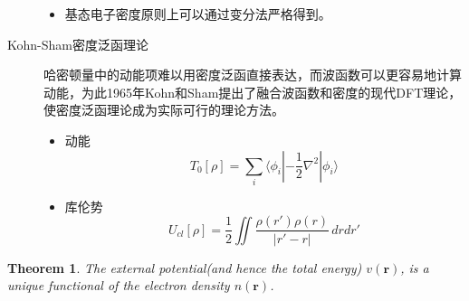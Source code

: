 \documentclass{article}
\newtheorem{theorem}{Theorem}[section]
\numberwithin{equation}{section}
\newcommand{\bracketl}[3]{\langle #1 | #2 | #3 \rangle}
\newcommand{\grad}{\nabla}
\begin{document}
\begin{description}
\begin{itemize}
      \item 基态电子密度原则上可以通过变分法严格得到。
  
    \end{itemize}
  
    \item[Kohn-Sham密度泛函理论]
    哈密顿量中的动能项难以用密度泛函直接表达，而波函数可以更容易地计算动能，为此1965年Kohn和Sham提出了融合波函数和密度的现代DFT理论，使密度泛函理论成为实际可行的理论方法。
  
    \begin{itemize}
      \item 动能
      \begin{equation}
      T_0[\rho]=\sum_i\bracketl{\phi_i}{-\frac{1}{2}\grad^2}{\phi_i}
      \end{equation}
  
      \item 库伦势
      \begin{equation}
      U_{cl}[\rho]=\frac{1}{2}\iint\frac{\rho(r')\rho(r)}{|r'-r|}\,drdr'
      \end{equation}
    \end{itemize}
  
  \end{description}
  
  
  \begin{theorem}
  The external potential(and hence the total energy) $v(\textbf{r})$, is a unique functional of the electron density $n(\textbf{r})$.
  \end{theorem}
  
\end{document}
